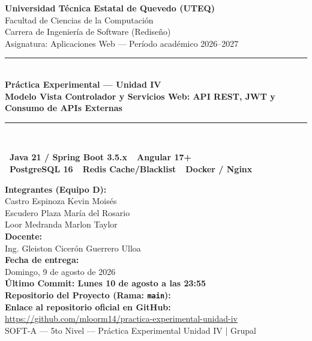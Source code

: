 \documentclass[12pt,a4paper]{article}
\newcommand{\badgeJAVA}{\colorbox{javacolor}{\color{white}\small\bfseries\ Java 21 / Spring Boot 3.5.x\ }}
\newcommand{\badgeAngular}{\colorbox{angularcolor}{\color{white}\small\bfseries\ Angular 17+\ }}
\newcommand{\badgePostgres}{\colorbox{postgrescolor}{\color{white}\small\bfseries\ PostgreSQL 16\ }}
\newcommand{\badgeRedis}{\colorbox{rediscolor}{\color{white}\small\bfseries\ Redis Cache/Blacklist\ }}
\newcommand{\badgeNginx}{\colorbox{nginxcolor}{\color{white}\small\bfseries\ Docker / Nginx\ }}
\begin{document}
\shorthandoff{<>}

\begin{titlepage}
\thispagestyle{empty}
\centering
\vspace*{0.5cm}
{\large\bfseries Universidad Técnica Estatal de Quevedo (UTEQ)}\\[0.2cm]
{\normalsize Facultad de Ciencias de la Computación}\\[0.1cm]
{\normalsize Carrera de Ingeniería de Software (Rediseño)}\\[0.1cm]
{\normalsize Asignatura: Aplicaciones Web --- Período académico 2026--2027}\\[1cm]
\rule{0.9\linewidth}{1pt}\\[0.4cm]
{\Large\bfseries\color{verdeuteq} Práctica Experimental --- Unidad IV}\\[0.2cm]
{\normalsize\bfseries Modelo Vista Controlador y Servicios Web: API REST, JWT y Consumo de APIs Externas}\\[0.3cm]
\rule{0.9\linewidth}{1pt}\\[0.6cm]
\begin{center}
\badgeJAVA\quad\badgeAngular\\[0.2cm]
\badgePostgres\quad\badgeRedis\quad\badgeNginx\\[0.2cm]
\end{center}
\vspace{0.6cm}
{\normalsize\bfseries Integrantes (Equipo D):}\\[0.1cm]
Castro Espinoza Kevin Moisés\\
Escudero Plaza María del Rosario\\
Loor Medranda Marlon Taylor\\[0.6cm]
{\normalsize\bfseries Docente:}\\
Ing. Gleiston Cicerón Guerrero Ulloa\\[0.6cm]
{\normalsize\bfseries Fecha de entrega:}\\
Domingo, 9 de agosto de 2026\\[0.8cm]
\textbf{Último Commit: Lunes 10 de agosto a las 23:55}\\
{\normalsize\bfseries Repositorio del Proyecto (Rama: \texttt{main}):}\\[0.4cm]
{\small
\textbf{Enlace al repositorio oficial en GitHub:}\\
\url{https://github.com/mloorm14/practica-experimental-unidad-iv}
}\\[0.5cm]
{\small SOFT-A --- 5to Nivel --- Práctica Experimental Unidad IV | Grupal}
\end{titlepage}
\end{document}
